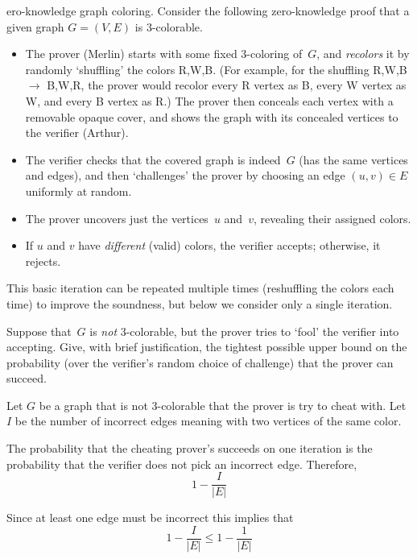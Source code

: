 \documentclass[12pt, letterpaper]{article}
\begin{document}
\begin{problem}{ero-knowledge graph coloring.}
    Consider the following zero-knowledge proof that a given graph $G=(V,E)$ is 3-colorable.
  \begin{itemize}
  \item The prover (Merlin) starts with some fixed 3-coloring of~$G$, and \emph{recolors} it by randomly `shuffling' the colors R,W,B.
    (For example, for the shuffling R,W,B $\to$ B,W,R, the prover would recolor every R vertex as B, every W vertex as W, and every B vertex as R.)
    The prover then conceals each vertex with a removable opaque cover, and shows the graph with its concealed vertices to the verifier (Arthur).

  \item The verifier checks that the covered graph is indeed~$G$ (has the same vertices and edges), and then `challenges' the prover by choosing an edge $(u,v) \in E$ uniformly at random.

  \item The prover uncovers just the vertices~$u$ and~$v$, revealing their assigned colors.

  \item If $u$ and $v$ have \emph{different} (valid) colors, the verifier accepts; otherwise, it rejects.
  \end{itemize}
  This basic iteration can be repeated multiple times (reshuffling the colors each time) to improve the soundness, but below we consider only a single iteration.
\end{problem}
\begin{subproblem}{}
    Suppose that~$G$ is \emph{not} 3-colorable, but the prover tries to `fool' the verifier into accepting.
    Give, with brief justification, the tightest possible upper bound on the probability (over the verifier's random choice of challenge) that the prover can succeed.
\end{subproblem}
\begin{problemproof}
    Let $G$ be a graph that is not 3-colorable that the prover is try to cheat with. Let $I$ be the number of incorrect edges meaning with two vertices of the same color.

    The probability that the cheating prover's succeeds on one iteration is the probability that the verifier does not pick an incorrect edge. Therefore,
    \[1-\dfrac{I}{|E|}\]

    Since at least one edge must be incorrect this implies that
    \[1-\dfrac{I}{|E|} \leq 1-\dfrac{1}{|E|}\]
\end{problemproof}
\end{document}
